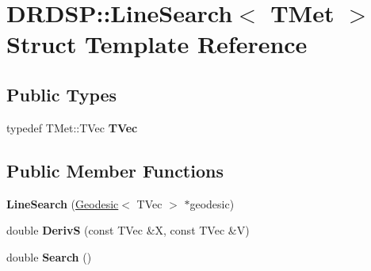 \hypertarget{struct_d_r_d_s_p_1_1_line_search}{\section{D\-R\-D\-S\-P\-:\-:Line\-Search$<$ T\-Met $>$ Struct Template Reference}
\label{struct_d_r_d_s_p_1_1_line_search}
}
\subsection*{Public Types}
\begin{DoxyCompactItemize}
\item 
\hypertarget{struct_d_r_d_s_p_1_1_line_search_a0a4f464ca776f11974fbe1bf8b5b10ef}{typedef T\-Met\-::\-T\-Vec {\bfseries T\-Vec}}\label{struct_d_r_d_s_p_1_1_line_search_a0a4f464ca776f11974fbe1bf8b5b10ef}

\end{DoxyCompactItemize}
\subsection*{Public Member Functions}
\begin{DoxyCompactItemize}
\item 
\hypertarget{struct_d_r_d_s_p_1_1_line_search_a11c98ca28033eb725eb0f8c0c2165415}{{\bfseries Line\-Search} (\hyperlink{struct_d_r_d_s_p_1_1_geodesic}{Geodesic}$<$ T\-Vec $>$ $\ast$geodesic)}\label{struct_d_r_d_s_p_1_1_line_search_a11c98ca28033eb725eb0f8c0c2165415}

\item 
\hypertarget{struct_d_r_d_s_p_1_1_line_search_a4ea0db15193335a91e76b2e6460eac14}{double {\bfseries Deriv\-S} (const T\-Vec \&X, const T\-Vec \&V)}\label{struct_d_r_d_s_p_1_1_line_search_a4ea0db15193335a91e76b2e6460eac14}

\item 
\hypertarget{struct_d_r_d_s_p_1_1_line_search_ab33f387294ebe3f8fe93a1a35b86bca3}{double {\bfseries Search} ()}\label{struct_d_r_d_s_p_1_1_line_search_ab33f387294ebe3f8fe93a1a35b86bca3}

\end{DoxyCompactItemize}
